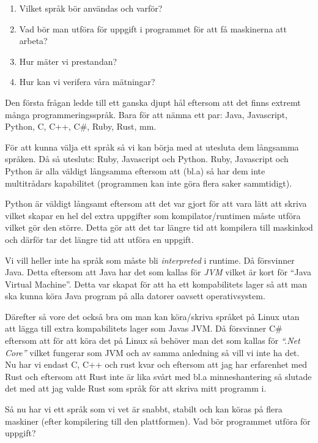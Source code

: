 \documentclass[12pt, a4paper]{report}
\begin{document}
\begin{enumerate}
   \item Vilket språk bör användas och varför?
   \item Vad bör man utföra för uppgift i programmet för att få maskinerna att arbeta?
   \item Hur mäter vi prestandan?
   \item Hur kan vi verifera våra mätningar?
\end{enumerate}
 
Den första frågan ledde till ett ganska djupt hål eftersom att det finns extremt många programmeringsspråk. Bara för att nämna ett par: Java, Javascript, Python, C, C++, C\#, Ruby, Rust, mm. 


För att kunna välja ett språk så vi kan börja med at utesluta dem långsamma språken. Då så utesluts: Ruby, Javascript och Python. Ruby, Javascript och Python är alla väldigt långsamma eftersom att (bl.a) så har dem inte multitrådars kapabilitet (programmen kan inte göra flera saker sammtidigt).

 Python är väldigt långsamt eftersom att det var gjort för att vara lätt att skriva vilket skapar en hel del extra uppgifter som kompilator/runtimen måste utföra vilket gör den större. Detta gör att det tar längre tid att kompilera till maskinkod och därför tar det längre tid att utföra en uppgift. 
 
 Vi vill heller inte ha språk som måste bli \textit{interpreted} i runtime. Då försvinner Java. Detta eftersom att Java har det som kallas för \textit{JVM} vilket är kort för ``Java Virtual Machine''. Detta var skapat för att ha ett kompabilitets lager så att man ska kunna köra Java program på alla datorer oavsett operativsystem. 
 
 Därefter så vore det också bra om man kan köra/skriva språket på Linux utan att lägga till extra kompabilitets lager som Javas JVM. Då försvinner C\# eftersom att för att köra det på Linux så behöver man det som kallas för \textit{``.Net Core''} vilket fungerar som JVM och av samma anledning så vill vi inte ha det. Nu har vi endast C, C++ och rust kvar och eftersom att jag har erfarenhet med Rust och eftersom att Rust inte är lika svårt med bl.a minneshantering så slutade det med att jag valde Rust som språk för att skriva mitt programm i.
 
 
Så nu har vi ett språk som vi vet är snabbt, stabilt och kan köras på flera maskiner (efter kompilering till den plattformen). Vad bör programmet utföra för uppgift?
\end{document}
